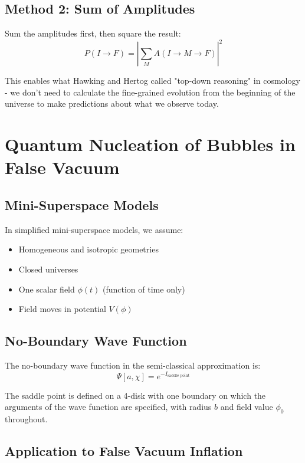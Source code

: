 \documentclass[12pt,a4paper]{article}
\begin{document}
\subsection{Method 2: Sum of Amplitudes}
Sum the amplitudes first, then square the result:
\begin{equation}
P(I \rightarrow F) = \left|\sum_M A(I \rightarrow M \rightarrow F)\right|^2
\end{equation}

This enables what Hawking and Hertog called "top-down reasoning" in cosmology - we don't need to calculate the fine-grained evolution from the beginning of the universe to make predictions about what we observe today.

\section{Quantum Nucleation of Bubbles in False Vacuum}

\subsection{Mini-Superspace Models}

In simplified mini-superspace models, we assume:
\begin{itemize}
    \item Homogeneous and isotropic geometries
    \item Closed universes
    \item One scalar field $\phi(t)$ (function of time only)
    \item Field moves in potential $V(\phi)$
\end{itemize}

\subsection{No-Boundary Wave Function}

The no-boundary wave function in the semi-classical approximation is:
\begin{equation}
\Psi[a,\chi] = e^{-I_{\text{saddle point}}}
\end{equation}

The saddle point is defined on a 4-disk with one boundary on which the arguments of the wave function are specified, with radius $b$ and field value $\phi_0$ throughout.

\subsection{Application to False Vacuum Inflation}
\end{document}

